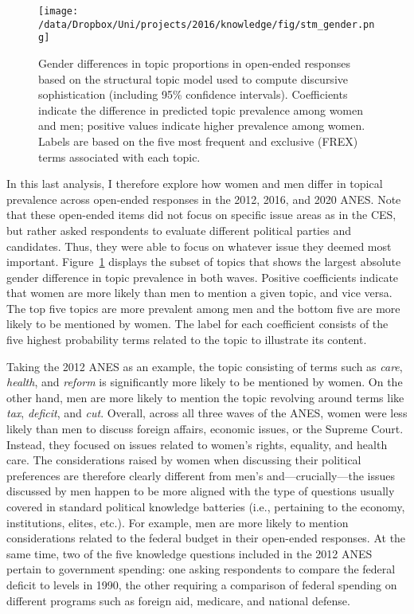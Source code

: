 \begin{figure}[ht]\centering
\texttt{[image: /data/Dropbox/Uni/projects/2016/knowledge/fig/stm\_gender.png]}
\caption[Gender differences in topic proprtions in open-ended responses]{Gender differences in topic proportions in open-ended responses based on the structural topic model used to compute discursive sophistication (including 95\% confidence intervals). Coefficients indicate the difference in predicted topic prevalence among women and men; positive values indicate higher prevalence among women. Labels are based on the five most frequent and exclusive (FREX) terms associated with each topic.}\label{fig:stm_gender}
\end{figure}

In this last analysis, I therefore explore how women and men differ in topical prevalence across open-ended responses in the 2012, 2016, and 2020 ANES. Note that these open-ended items did not focus on specific issue areas as in the CES, but rather asked respondents to evaluate different political parties and candidates. Thus, they were able to focus on whatever issue they deemed most important. Figure~\ref{fig:stm_gender} displays the subset of topics that shows the largest absolute gender difference in topic prevalence in both waves. Positive coefficients indicate that women are more likely than men to mention a given topic, and vice versa. The top five topics are more prevalent among men and the bottom five are more likely to be mentioned by women. The label for each coefficient consists of the five highest probability terms related to the topic to illustrate its content.

Taking the 2012 ANES as an example, the topic consisting of terms such as \textit{care}, \textit{health}, and \textit{reform} is significantly more likely to be mentioned by women. On the other hand, men are more likely to mention the topic revolving around terms like \textit{tax}, \textit{deficit}, and \textit{cut}. Overall, across all three waves of the ANES, women were less likely than men to discuss foreign affairs, economic issues, or the Supreme Court. Instead, they focused on issues related to women's rights, equality, and health care. The considerations raised by women when discussing their political preferences are therefore clearly different from men's and---crucially---the issues discussed by men happen to be more aligned with the type of questions usually covered in standard political knowledge batteries (i.e., pertaining to the economy, institutions, elites, etc.). For example, men are more likely to mention considerations related to the federal budget in their open-ended responses. At the same time, two of the five knowledge questions included in the 2012 ANES pertain to government spending: one asking respondents to compare the federal deficit to levels in 1990, the other requiring a comparison of federal spending on different programs such as foreign aid, medicare, and national defense.

